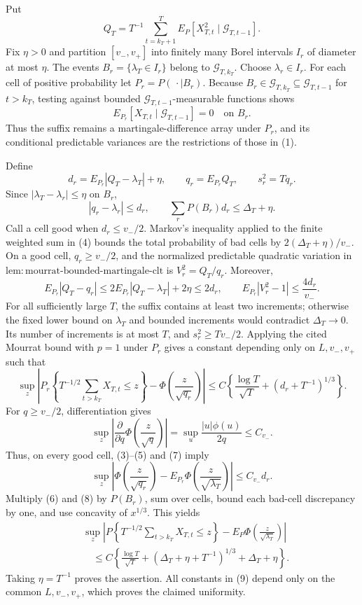Put
\[
 Q_T=T^{-1}\sum_{t=k_T+1}^T
 E_P[X_{T,t}^2\mid\mathcal G_{T,t-1}].
\tag{1}
\]
Fix \(\eta>0\) and partition \([v_-,v_+]\) into finitely many Borel intervals
\(I_r\) of diameter at most \(\eta\).  The events
\(B_r=\{\lambda_T\in I_r\}\) belong to \(\mathcal G_{T,k_T}\).  Choose
\(\lambda_r\in I_r\).  For each cell of positive probability let
\(P_r=P(\,\cdot\mid B_r)\).  Because
\(B_r\in\mathcal G_{T,k_T}\subseteq\mathcal G_{T,t-1}\) for \(t>k_T\),
testing against bounded \(\mathcal G_{T,t-1}\)-measurable functions shows
\[
 E_{P_r}[X_{T,t}\mid\mathcal G_{T,t-1}]=0
 \quad\text{on }B_r.
\tag{2}
\]
Thus the suffix remains a martingale-difference array under \(P_r\), and its
conditional predictable variances are the restrictions of those in (1).

Define
\[
 d_r=E_{P_r}|Q_T-\lambda_T|+\eta,
 \qquad q_r=E_{P_r}Q_T,
 \qquad s_r^2=Tq_r.
\tag{3}
\]
Since \(|\lambda_T-\lambda_r|\le\eta\) on \(B_r\),
\[
 |q_r-\lambda_r|\le d_r,
 \qquad
 \sum_rP(B_r)d_r\le\Delta_T+\eta.
\tag{4}
\]
Call a cell good when \(d_r\le v_-/2\).  Markov's inequality applied to the
finite weighted sum in (4) bounds the total probability of bad cells by
\(2(\Delta_T+\eta)/v_-\).  On a good cell, \(q_r\ge v_-/2\), and the
normalized predictable quadratic variation in
\(\mathrm{lem:mourrat\text{-}bounded\text{-}martingale\text{-}clt}\) is
\(V_r^2=Q_T/q_r\).  Moreover,
\[
 E_{P_r}|Q_T-q_r|
 \le2E_{P_r}|Q_T-\lambda_T|+2\eta\le2d_r,
 \qquad
 E_{P_r}|V_r^2-1|\le\frac{4d_r}{v_-}.
\tag{5}
\]
For all sufficiently large \(T\), the suffix contains at least two increments;
otherwise the fixed lower bound on \(\lambda_T\) and bounded increments would
contradict \(\Delta_T\to0\).  Its number of increments is at most \(T\), and
\(s_r^2\ge Tv_-/2\).  Applying the cited Mourrat bound with \(p=1\) under
\(P_r\) gives a constant depending only on \(L,v_-,v_+\) such that
\[
 \sup_z\left|P_r\left\{T^{-1/2}\sum_{t>k_T}X_{T,t}\le z\right\}
 -\Phi\left(\frac z{\sqrt{q_r}}\right)\right|
 \le C\left\{\frac{\log T}{\sqrt T}
 +(d_r+T^{-1})^{1/3}\right\}.
\tag{6}
\]
For \(q\ge v_-/2\), differentiation gives
\[
 \sup_z\left|\frac{\partial}{\partial q}
 \Phi\left(\frac z{\sqrt q}\right)\right|
 =\sup_u\frac{|u|\phi(u)}{2q}\le C_{v_-}.
\tag{7}
\]
Thus, on every good cell, (3)--(5) and (7) imply
\[
 \sup_z\left|\Phi\left(\frac z{\sqrt{q_r}}\right)
 -E_{P_r}\Phi\left(\frac z{\sqrt{\lambda_T}}\right)\right|
 \le C_{v_-}d_r.
\tag{8}
\]
Multiply (6) and (8) by \(P(B_r)\), sum over cells, bound each bad-cell
discrepancy by one, and use concavity of \(x^{1/3}\).  This yields
\[
 \begin{aligned}
 &\sup_z\left|P\left\{T^{-1/2}\sum_{t>k_T}X_{T,t}\le z\right\}
 -E_P\Phi\left(\frac z{\sqrt{\lambda_T}}\right)\right|\\
 &\quad\le C\left\{\frac{\log T}{\sqrt T}
 +(\Delta_T+\eta+T^{-1})^{1/3}+\Delta_T+\eta\right\}.
 \end{aligned}
\tag{9}
\]
Taking \(\eta=T^{-1}\) proves the assertion.  All constants in (9) depend
only on the common \(L,v_-,v_+\), which proves the claimed uniformity.